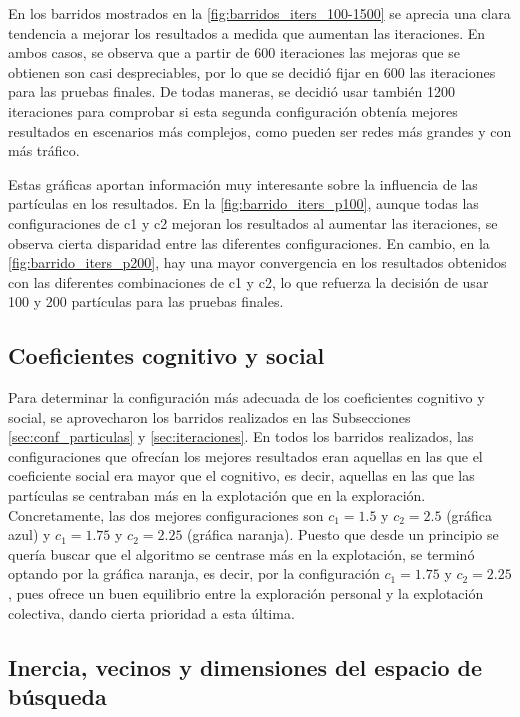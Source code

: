 En los barridos mostrados en la \autoref{fig:barridos_iters_100-1500} se aprecia una clara tendencia a mejorar los resultados a medida que aumentan las iteraciones. En ambos casos, se observa que a partir de 600 iteraciones las mejoras que se obtienen son casi despreciables, por lo que se decidió fijar en 600 las iteraciones para las pruebas finales. De todas maneras, se decidió usar también 1200 iteraciones para comprobar si esta segunda configuración obtenía mejores resultados en escenarios más complejos, como pueden ser redes más grandes y con más tráfico.

Estas gráficas aportan información muy interesante sobre la influencia de las partículas en los resultados. En la \autoref{fig:barrido_iters_p100}, aunque todas las configuraciones de c1 y c2 mejoran los resultados al aumentar las iteraciones, se observa cierta disparidad entre las diferentes configuraciones. En cambio, en la \autoref{fig:barrido_iters_p200}, hay una mayor convergencia en los resultados obtenidos con las diferentes combinaciones de c1 y c2, lo que refuerza la decisión de usar 100 y 200 partículas para las pruebas finales.

\subsection{Coeficientes cognitivo y social}

Para determinar la configuración más adecuada de los coeficientes cognitivo y social, se aprovecharon los barridos realizados en las Subsecciones \ref{sec:conf_particulas} y \ref{sec:iteraciones}. En todos los barridos realizados, las configuraciones que ofrecían los mejores resultados eran aquellas en las que el coeficiente social era mayor que el cognitivo, es decir, aquellas en las que las partículas se centraban más en la explotación que en la exploración. Concretamente, las dos mejores configuraciones son $c_1 = 1.5$ y $c_2 = 2.5$ (gráfica azul) y $c_1 = 1.75$ y $c_2 = 2.25$ (gráfica naranja). Puesto que desde un principio se quería buscar que el algoritmo se centrase más en la explotación, se terminó optando por la gráfica naranja, es decir, por la configuración $c_1 = 1.75$ y $c_2 = 2.25$, pues ofrece un buen equilibrio entre la exploración personal y la explotación colectiva, dando cierta prioridad a esta última.

\subsection{Inercia, vecinos y dimensiones del espacio de búsqueda}

